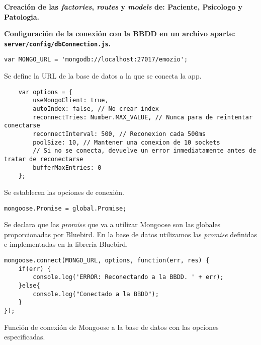  
\textbf{Creación de las \textit{factories}, \textit{routes} y \textit{models} de: Paciente, Psicologo y Patologia.}\newline


 
\textbf{Configuración de la conexión con la BBDD en un archivo aparte: \texttt{server/config/dbConnection.js}.}



\medskip
\begin{lstlisting}
var MONGO_URL = 'mongodb://localhost:27017/emozio';
\end{lstlisting}




Se define la URL de la base de datos a la que se conecta la app.



\medskip
\begin{lstlisting}
	var options = {
		useMongoClient: true,
		autoIndex: false, // No crear index
		reconnectTries: Number.MAX_VALUE, // Nunca para de reintentar conectarse
		reconnectInterval: 500, // Reconexion cada 500ms
		poolSize: 10, // Mantener una conexion de 10 sockets
		// Si no se conecta, devuelve un error inmediatamente antes de tratar de reconectarse
		bufferMaxEntries: 0
	};
\end{lstlisting}



Se establecen las opciones de conexión.



\medskip
\begin{lstlisting}
mongoose.Promise = global.Promise;
\end{lstlisting}



Se declara que las \textit{promise} que va a utilizar Mongoose son las globales proporcionadas por Bluebird. En la base de datos utilizamos las \textit{promise} definidas e implementadas en la librería Bluebird.



\medskip
\begin{lstlisting}
mongoose.connect(MONGO_URL, options, function(err, res) {
	if(err) {
		console.log('ERROR: Reconectando a la BBDD. ' + err);
	}else{
		console.log("Conectado a la BBDD");
	}
});
\end{lstlisting}



Función de conexión de Mongoose a la base de datos con las opciones especificadas.



